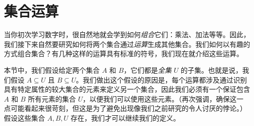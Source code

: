 \section{集合运算}\label{sec:section3.5}

当你初次学习数字时，很自然地就会学到如何\emph{组合}它们：乘法、加法等等。因此，我们接下来自然要研究如何将两个集合通过\emph{运算}生成其他集合。我们如何以有趣的方式组合集合？有几种这样的运算具有标准的符号，我们现在就介绍这些运算。

本节中，我们假设给定两个集合 $A$ 和 $B$，它们都是\emph{全集} $U$ 的子集。也就是说，我们假设 $A \subseteq U$ 且 $B \subseteq U$。我们做出这个假设的原因是，每个运算都涉及通过识别具有特定属性的较大集合的元素来定义另一个集合，因此我们必须有一个保证包含 $A$ 和 $B$ 所有元素的集合 $U$，以便我们可以使用这些元素。（再次强调，确保这一点可能看起来很苛刻，但这是为了避免出现像我们之前研究的令人讨厌的悖论。）假设这些集合 $A, B,U$ 存在，我们才可以继续我们的定义。









